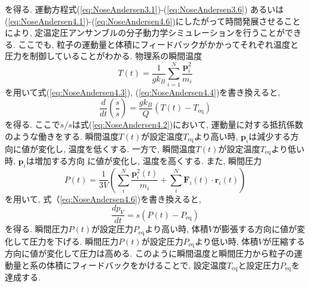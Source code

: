 を得る. 
運動方程式(\ref{eq:NoseAndersen3.1})-(\ref{eq:NoseAndersen3.6})
あるいは(\ref{eq:NoseAndersen4.1})-(\ref{eq:NoseAndersen4.6})にしたがって時間発展させることにより, 定温定圧アンサンブルの分子動力学シミュレーションを行うことができる. 
ここでも, 粒子の運動量と体積にフィードバックがかかってそれぞれ温度と圧力を制御していることがわかる. 
物理系の瞬間温度
\begin{equation}
 T(t) = \frac{1}{g k_{B}} \sum_{i=1}^{N} \frac{\bm{p}_{i}^2}{m_{i}}
 \label{eq:NoseAndersen5}
\end{equation}
を用いて式(\ref{eq:NoseAndersen4.3}), (\ref{eq:NoseAndersen4.4})を書き換えると, 
\begin{equation}
 \frac{d}{d t} \left( \frac{\dot{s}}{s} \right)
  = \frac{g k_{B}}{Q} ( T(t) - T_{\mathrm{eq}})
 \label{eq:NoseAndersen6}
\end{equation}
を得る. 
ここで$\dot{s}/s$は式(\ref{eq:NoseAndersen4.2})において, 運動量に対する抵抗係数のような働きをする. 
瞬間温度$T(t)$が設定温度$T_{\mathrm{eq}}$より高い時, $\bm{p}_{i}$は減少する方向に値が変化し, 
温度を低くする. 
一方で, 瞬間温度$T(t)$が設定温度$T_{\mathrm{eq}}$より低い時, $\bm{p}_{i}$は増加する方向
に値が変化し, 温度を高くする. 
また, 瞬間圧力
\begin{equation}
 P(t)
  = \frac{1}{3V}
  \left(
   \sum_{i}^{N} \frac{\bm{p}_{i}^{2}(t)}{m_{i}}
 + \sum_{i}^{N} \bm{F}_{i}(t) \cdot \bm{r}_{i}(t)
  \right)
 \label{eq:NoseAndersen7}
\end{equation}
を用いて, 式（\ref{eq:NoseAndersen4.6})を書き換えると, 
\begin{equation}
 \frac{d p_{V}}{d t}
  = s \left(
       P(t) - P_{\mathrm{eq}}
      \right)
 \label{eq:NoseAndersen8}
\end{equation}
を得る. 
瞬間圧力$P(t)$が設定圧力$P_{\mathrm{eq}}$より高い時, 体積$V$が膨張する方向に値が変化して圧力を下げる. 
瞬間圧力$P(t)$が設定圧力$P_{\mathrm{eq}}$より低い時, 体積$V$が圧縮する方向に値が変化して圧力は高める. 
このように瞬間温度と瞬間圧力から粒子の運動量と系の体積にフィードバックをかけることで, 
設定温度$T_{\mathrm{eq}}$と設定圧力$P_{\mathrm{eq}}$を達成する. 

